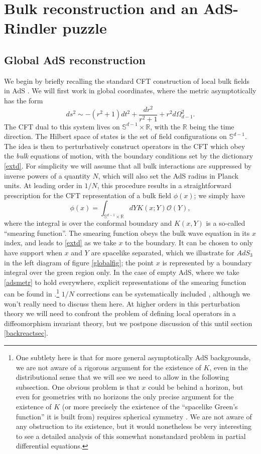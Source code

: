 \documentclass[12pt]{article}
\newcommand{\be}{\begin{equation}}
\newcommand{\ee}{\end{equation}}
\begin{document}
\section{Bulk reconstruction and an AdS-Rindler puzzle}
\subsection{Global AdS reconstruction}\label{globalsec}
We begin by briefly recalling the standard CFT construction of local bulk fields in AdS \cite{Banks:1998dd,Hamilton:2006az,Heemskerk:2012mn}.  We will first work in global coordinates, where the metric asymptotically has the form
\be\label{adsmetr}
ds^2\sim-(r^2+1)dt^2+\frac{dr^2}{r^2+1}+r^2 d\Omega_{d-1}^2.
\ee
The CFT dual to this system lives on $\mathbb{S}^{d-1}\times \mathbb{R}$, with the $\mathbb{R}$ being the time direction.  The Hilbert space of states is the set of field configurations on $\mathbb{S}^{d-1}$.  The idea is then to perturbatively construct operators in the CFT which obey the \textit{bulk} equations of motion, with the boundary conditions set by the dictionary \eqref{extd}.  For simplicity we will assume that all bulk interactions are suppressed by inverse powers of a quantity $N$, which will also set the AdS radius in Planck units. At leading order in $1/N$, this procedure results in a straightforward prescription for the CFT representation of a bulk field $\phi(x)$; we simply have
\be\label{smear}
\phi(x)=\int_{\mathbb{S}^{d-1}\times \mathbb{R}} dY K(x;Y)\mathcal{O}(Y),
\ee
where the integral is over the conformal boundary and $K(x,Y)$ is a so-called ``smearing function''.  The smearing function obeys the bulk wave equation in its $x$ index, and leads to \eqref{extd} as we take $x$ to the boundary.  It can be chosen to only have support when $x$ and $Y$ are spacelike separated, which we illustrate for $AdS_3$ in the left diagram of figure \ref{globalfig}; the point $x$ is represented by a boundary integral over the green region only.  In the case of empty AdS, where we take \eqref{adsmetr} to hold everywhere, explicit representations of the smearing function can be found in \cite{Hamilton:2006az,Heemskerk:2012mn}.\footnote{One subtlety here is that for more general asymptotically AdS backgrounds, we are not aware of a rigorous argument for the existence of $K$, even in the distributional sense that we will see we need to allow in the following subsection.  One obvious problem is that $x$ could be behind a horizon, but even for geometries with no horizons the only precise argument for the existence of $K$ (or more precisely the existence of the ``spacelike Green's function'' it is built from) requires spherical symmetry \cite{Heemskerk:2012mn}.  We are not aware of any obstruction to its existence, but it would nonetheless be very interesting to see a detailed analysis of this somewhat nonstandard problem in partial differential equations.}  $1/N$ corrections can be systematically included \cite{Kabat:2011rz,Heemskerk:2012mn}, although we won't really need to discuss them here.  At higher orders in this perturbation theory we will need to confront the problem of defining local operators in a diffeomorphism invariant theory, but we postpone discussion of this until section \ref{backreactsec}.  
\end{document}
